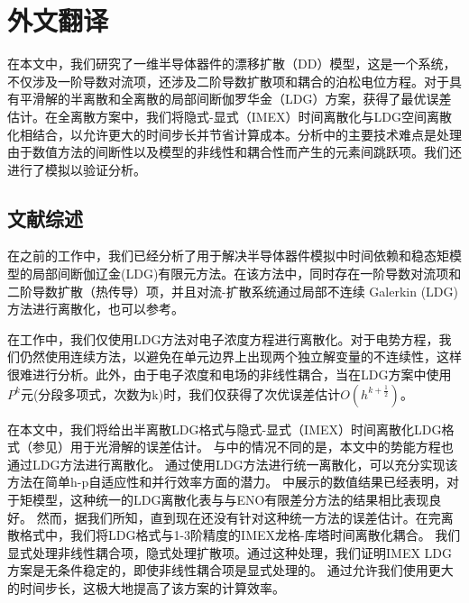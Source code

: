 \cleardoublepage

\newrefsection
\sectionmajornumbering

\chapter{外文翻译}

在本文中，我们研究了一维半导体器件的漂移扩散（DD）模型，这是一个系统，不仅涉及一阶导数对流项，还涉及二阶导数扩散项和耦合的泊松电位方程。对于具有平滑解的半离散和全离散的局部间断伽罗华金（LDG）方案，获得了最优误差估计。在全离散方案中，我们将隐式-显式（IMEX）时间离散化与LDG空间离散化相结合，以允许更大的时间步长并节省计算成本。分析中的主要技术难点是处理由于数值方法的间断性以及模型的非线性和耦合性而产生的元素间跳跃项。我们还进行了模拟以验证分析。

\section{文献综述}
在之前的工作\parencite{liu2010errorc}中，我们已经分析了用于解决半导体器件模拟中时间依赖和稳态矩模型的局部间断伽辽金(LDG)有限元方法。在该方法中，同时存在一阶导数对流项和二阶导数扩散（热传导）项，并且对流-扩散系统通过局部不连续 Galerkin (LDG) 方法进行离散化\parencite{cockburn1998local,cockburn2001runge}，也可以参考\parencite{bank1983numerical,bank1998finite,chainais2003finite,bessemoulin2012finite}。

在工作\parencite{liu2010errorc}中，我们仅使用LDG方法对电子浓度方程进行离散化。对于电势方程，我们仍然使用连续方法，以避免在单元边界上出现两个独立解变量的不连续性，这样很难进行分析。此外，由于电子浓度和电场的非线性耦合，当在LDG方案中使用$P^k$元(分段多项式，次数为k)时，我们仅获得了次优误差估计$O(h^{k+\frac{1}{2}})$。

在本文中，我们将给出半离散LDG格式与隐式-显式（IMEX）时间离散化LDG格式（参见\parencite{wang2015stability,wang2015stabilityd}）用于光滑解的误差估计。
与\parencite{liu2010errorc}中的情况不同的是，本文中的势能方程也通过LDG方法进行离散化。
通过使用LDG方法进行统一离散化，可以充分实现该方法在简单h-p自适应性和并行效率方面的潜力。
\parencite{liu2004local,liu2007locala}中展示的数值结果已经表明，对于矩模型，这种统一的LDG离散化表与与ENO有限差分方法\parencite{jerome1994energy}的结果相比表现良好。
然而，据我们所知，直到现在还没有针对这种统一方法的误差估计。在完离散格式中，我们将LDG格式与1-3阶精度的IMEX龙格-库塔时间离散化耦合。
我们显式处理非线性耦合项，隐式处理扩散项。通过这种处理，我们证明IMEX LDG方案是无条件稳定的，即使非线性耦合项是显式处理的。
通过允许我们使用更大的时间步长，这极大地提高了该方案的计算效率。

